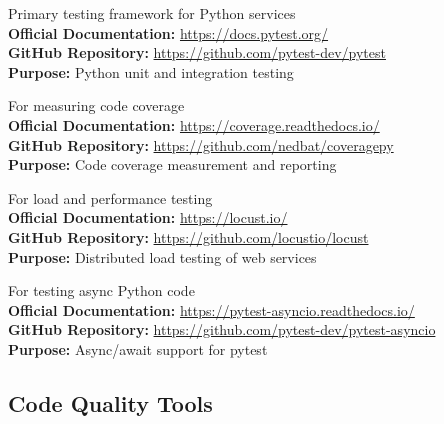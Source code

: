 \documentclass[12pt,a4paper]{article}
\begin{document}
\begin{description}[style=nextline]
    \item[Pytest] Primary testing framework for Python services \\
    \textbf{Official Documentation:} \url{https://docs.pytest.org/} \\
    \textbf{GitHub Repository:} \url{https://github.com/pytest-dev/pytest} \\
    \textbf{Purpose:} Python unit and integration testing
    
    \item[Coverage.py] For measuring code coverage \\
    \textbf{Official Documentation:} \url{https://coverage.readthedocs.io/} \\
    \textbf{GitHub Repository:} \url{https://github.com/nedbat/coveragepy} \\
    \textbf{Purpose:} Code coverage measurement and reporting
    
    \item[Locust] For load and performance testing \\
    \textbf{Official Documentation:} \url{https://locust.io/} \\
    \textbf{GitHub Repository:} \url{https://github.com/locustio/locust} \\
    \textbf{Purpose:} Distributed load testing of web services
    
    \item[Pytest-asyncio] For testing async Python code \\
    \textbf{Official Documentation:} \url{https://pytest-asyncio.readthedocs.io/} \\
    \textbf{GitHub Repository:} \url{https://github.com/pytest-dev/pytest-asyncio} \\
    \textbf{Purpose:} Async/await support for pytest
\end{description}

\subsection{Code Quality Tools}
\end{document}
